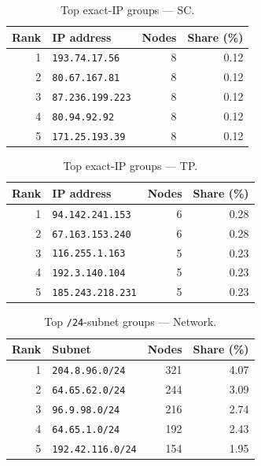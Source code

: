 \documentclass[conference]{IEEEtran}
\begin{document}
\begin{table}[H]
\caption{Top exact-IP groups --- SC.}
\begin{center}\small
\begin{tabular}{|r|l|r|r|}
\hline
\textbf{Rank} & \textbf{IP address} & \textbf{Nodes} & \textbf{Share (\%)} \\ \hline
1 & \texttt{193.74.17.56} & 8 & 0.12 \\ \hline
2 & \texttt{80.67.167.81} & 8 & 0.12 \\ \hline
3 & \texttt{87.236.199.223} & 8 & 0.12 \\ \hline
4 & \texttt{80.94.92.92} & 8 & 0.12 \\ \hline
5 & \texttt{171.25.193.39} & 8 & 0.12 \\ \hline
\end{tabular}
\label{tab:ip_count_static_control}
\end{center}\end{table}
 
\begin{table}[H]
\caption{Top exact-IP groups --- TP.}
\begin{center}\small
\begin{tabular}{|r|l|r|r|}
\hline
\textbf{Rank} & \textbf{IP address} & \textbf{Nodes} & \textbf{Share (\%)} \\ \hline
1 & \texttt{94.142.241.153} & 6 & 0.28 \\ \hline
2 & \texttt{67.163.153.240} & 6 & 0.28 \\ \hline
3 & \texttt{116.255.1.163} & 5 & 0.23 \\ \hline
4 & \texttt{192.3.140.104} & 5 & 0.23 \\ \hline
5 & \texttt{185.243.218.231} & 5 & 0.23 \\ \hline
\end{tabular}
\label{tab:ip_count_third_party_probe}
\end{center}\end{table}
 
\begin{table}[H]
\caption{Top \texttt{/24}-subnet groups --- Network.}
\begin{center}\small
\begin{tabular}{|r|l|r|r|}
\hline
\textbf{Rank} & \textbf{Subnet} & \textbf{Nodes} & \textbf{Share (\%)} \\ \hline
1 & \texttt{204.8.96.0/24} & 321 & 4.07 \\ \hline
2 & \texttt{64.65.62.0/24} & 244 & 3.09 \\ \hline
3 & \texttt{96.9.98.0/24} & 216 & 2.74 \\ \hline
4 & \texttt{64.65.1.0/24} & 192 & 2.43 \\ \hline
5 & \texttt{192.42.116.0/24} & 154 & 1.95 \\ \hline
\end{tabular}
\label{tab:subnet_count_network}
\end{center}\end{table}
 
\end{document}
